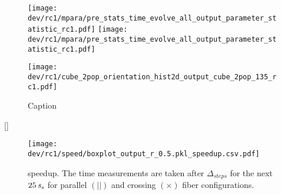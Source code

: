%
\begin{sidewaysfigure}[]
\centering
\texttt{[image: dev/rc1/mpara/pre\_stats\_time\_evolve\_all\_output\_parameter\_statistic\_rc1.pdf]}
\texttt{[image: dev/rc1/mpara/pre\_stats\_time\_evolve\_all\_output\_parameter\_statistic\_rc1.pdf]}
\label{app:pste5}
\end{sidewaysfigure}
%
%
%
\begin{figure}
    \centering
    \texttt{[image: dev/rc1/cube\_2pop\_orientation\_hist2d\_output\_cube\_2pop\_135\_rc1.pdf]}
    \caption{Caption}
    \label{app:modelHistOrientation}
\end{figure}[]
%
%
\begin{figure}[!t]
\centering
\texttt{[image: dev/rc1/speed/boxplot\_output\_r\_0.5.pkl\_speedup.csv.pdf]}
\caption[ speedup]{ speedup. The time measurements are taken after $\Delta_{\mathit{steps}}$ for the next $\SI{25}{\textnormal{$\mathit{s_{s}}$}}$ for parallel $(||)$ and crossing $(\times)$ fiber configurations.}
\label{app:solverSpeedupAll}
\end{figure}
%
%
%
